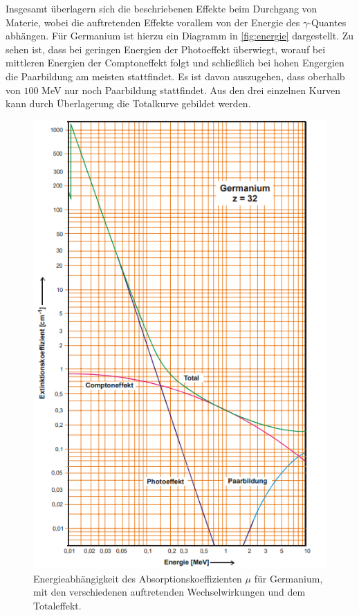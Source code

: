 Insgesamt überlagern sich die beschriebenen Effekte beim Durchgang von Materie, wobei die auftretenden Effekte vorallem von der Energie 
des $\gamma$-Quantes abhängen. Für Germanium ist hierzu ein Diagramm in \autoref{fig:energie} dargestellt. Zu sehen ist, dass bei geringen 
Energien der Photoeffekt überwiegt, worauf bei mittleren Energien der Comptoneffekt folgt und schließlich bei hohen Engergien die Paarbildung 
am meisten stattfindet. Es ist davon auszugehen, dass oberhalb von $100$ MeV nur noch Paarbildung stattfindet. Aus den drei einzelnen Kurven
kann durch Überlagerung die Totalkurve gebildet werden.
\begin{figure}
        \centering
        \includegraphics[width=\textwidth]{content/energieabhaengigkeit.png}
        \caption{Energieabhängigkeit des Absorptionskoeffizienten $\mu$ für Germanium, mit den verschiedenen auftretenden Wechselwirkungen und dem Totaleffekt\cite[236]{V704}.}
        \label{fig:energie}
    \end{figure}

